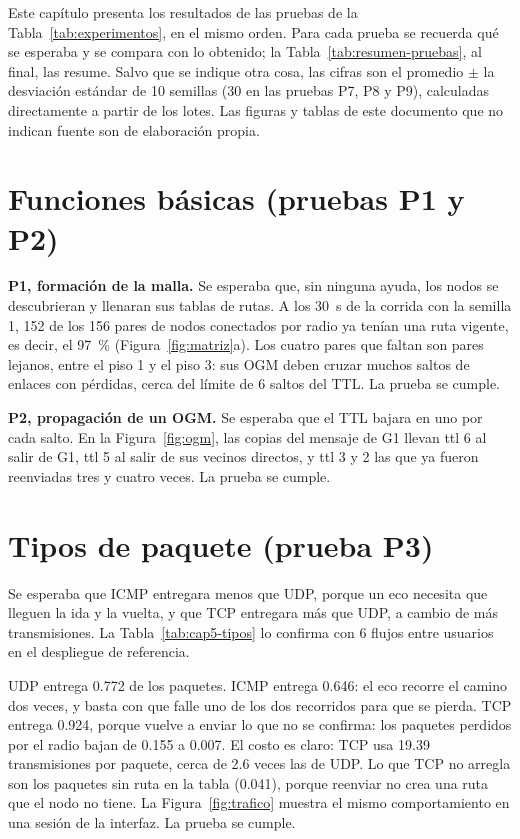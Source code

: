 
Este capítulo presenta los resultados de las pruebas de la
Tabla~\ref{tab:experimentos}, en el mismo orden. Para cada prueba se recuerda
qué se esperaba y se compara con lo obtenido; la Tabla~\ref{tab:resumen-pruebas},
al final, las resume. Salvo que se indique otra cosa, las cifras son el promedio
$\pm$ la desviación estándar de 10 semillas (30 en las pruebas P7, P8 y P9),
calculadas directamente a partir de
los lotes. Las figuras y tablas de este documento que no indican fuente son de
elaboración propia.

\section{Funciones básicas (pruebas P1 y P2)}
\label{sec:res-basicas}

\textbf{P1, formación de la malla.} Se esperaba que, sin ninguna ayuda, los
nodos se descubrieran y llenaran sus tablas de rutas. A los 30~s de la corrida
con la semilla 1, 152 de los 156 pares de nodos conectados por radio ya tenían
una ruta vigente, es decir, el 97~\% (Figura~\ref{fig:matriz}a). Los cuatro
pares que faltan son pares lejanos, entre el piso 1 y el piso 3: sus OGM deben
cruzar muchos saltos de enlaces con pérdidas, cerca del límite de 6 saltos del
TTL. La prueba se cumple.

\textbf{P2, propagación de un OGM.} Se esperaba que el TTL bajara en uno por
cada salto. En la Figura~\ref{fig:ogm}, las copias del mensaje de G1 llevan ttl
6 al salir de G1, ttl 5 al salir de sus vecinos directos, y ttl 3 y 2 las que ya
fueron reenviadas tres y cuatro veces.
La prueba se cumple.

\section{Tipos de paquete (prueba P3)}
\label{sec:res-tipos}

Se esperaba que ICMP entregara menos que UDP, porque un eco necesita que
lleguen la ida y la vuelta, y que TCP entregara más que UDP, a cambio de más
transmisiones. La Tabla~\ref{tab:cap5-tipos} lo confirma con 6 flujos entre
usuarios en el despliegue de referencia.



UDP entrega 0.772 de los paquetes. ICMP entrega 0.646: el eco recorre el camino
dos veces, y basta con que falle uno de los dos recorridos para que se pierda.
TCP entrega 0.924, porque vuelve a enviar lo que no se confirma: los paquetes
perdidos por el radio bajan de 0.155 a 0.007. El costo es claro: TCP usa 19.39
transmisiones por paquete, cerca de 2.6 veces las de UDP. Lo que TCP no arregla
son los paquetes sin ruta en la tabla (0.041), porque reenviar no crea una ruta
que el nodo no tiene. La Figura~\ref{fig:trafico} muestra el mismo
comportamiento en una sesión de la interfaz. La prueba se cumple.

